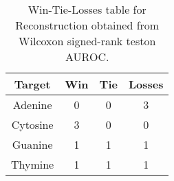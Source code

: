 \begin{table}[H]
\centering
\begin{tabular}{|c|c|c|c|}

\textbf{Target} &  \textbf{Win} &  \textbf{Tie} &  \textbf{Losses} \\
\hline

        Adenine &             0 &             0 &                3 \\
\hline
       Cytosine &             3 &             0 &                0 \\
\hline
        Guanine &             1 &             1 &                1 \\
\hline
        Thymine &             1 &             1 &                1 \\
\hline

\end{tabular}
\caption{Win-Tie-Losses table for Reconstruction obtained from Wilcoxon signed-rank teston AUROC.}
\label{tab:reconstruction_nucleotides_comparison}
\end{table}